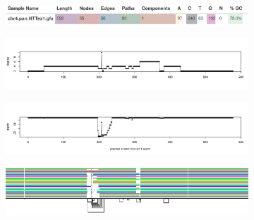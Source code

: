 \begin{figure}[ht!]
    \begin{subfigure}{\linewidth}
        \caption{}
        \centering
        \includegraphics[width=1.0\linewidth, trim=-2.25cm 1.0cm 0cm 3.75cm]{fig/metrics/chr4_pan_HTTex1_gfa_multiqc_odgi_stats_svg}
        \label{fig:metrics-multiqc}
        	\vspace{-2em}
    \end{subfigure}
    \begin{subfigure}{1\linewidth}
        \caption{}
        \centering
        \includegraphics[width=\linewidth,trim=-.225cm 4cm +.425cm +3cm]{fig/metrics/chr4_HTT_chm13_degree_w1_bed}
        \label{fig:metrics-degree}
    \end{subfigure}
    \begin{subfigure}{\linewidth}
        \caption{}
        \centering
        \includegraphics[width=\linewidth,trim=-.225cm 3.3cm +0.425cm +3cm]{fig/metrics/chr4_HTT_chm13_depth_w1_bed}
        \label{fig:metrics-depth}
    \end{subfigure}
    \begin{subfigure}{\linewidth}
        \caption{}
        \centering
        \includegraphics[width=1.0\linewidth, trim=-1.75cm 2.2cm -0.75cm 0.5cm]{fig/metrics/chr4_pan_fa_a2fb268_4030258_6a1ecc2_smooth_gfa_og_HTTex1_og_O_og_tiny_og_png_svg.pdf}

\end{subfigure}
\end{figure}
